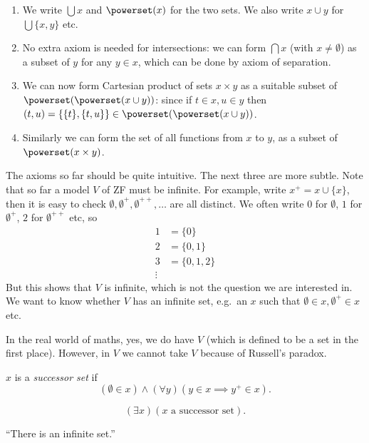 \documentclass[a4paper]{article}
\begin{document}
\begin{note}\leavevmode
  \begin{enumerate}
  \item We write \(\bigcup x\) and \(\powerset(x)\) for the two sets. We also write \(x \cup y\) for \(\bigcup \{x, y\}\) etc.
  \item No extra axiom is needed for intersections: we can form \(\bigcap x\) (with \(x \neq \emptyset\)) as a subset of \(y\) for any \(y \in x\), which can be done by axiom of separation.
  \item We can now form Cartesian product of sets \(x \times y\) as a suitable subset of \(\powerset(\powerset(x \cup y))\): since if \(t \in x, u \in y\) then \((t, u) = \{\{t\}, \{t, u\}\} \in \powerset(\powerset(x \cup y))\).
  \item Similarly we can form the set of all functions from \(x\) to \(y\), as a subset of \(\powerset(x \times y)\).
  \end{enumerate}
\end{note}

The axioms so far should be quite intuitive. The next three are more subtle. Note that so far a model \(V\) of ZF must be infinite. For example, write \(x^+ = x \cup \{x\}\), then it is easy to check \(\emptyset, \emptyset^+, \emptyset^{++}, \dots\) are all distinct. We often write \(0\) for \(\emptyset\), \(1\) for \(\emptyset^+\), \(2\) for \(\emptyset^{++}\) etc, so
\begin{align*}
  1 &= \{0\} \\
  2 &= \{0, 1\} \\
  3 &= \{0, 1, 2\} \\
  \vdots
\end{align*}
But this shows that \(V\) is infinite, which is not the question we are interested in. We want to know whether \(V \) has an infinite set, e.g.\ an \(x\) such that \(\emptyset \in x, \emptyset^+ \in x\) etc.

In the real world of maths, yes, we do have \(V\) (which is defined to be a set in the first place). However, in \(V\) we cannot take \(V\) because of Russell's paradox.

\begin{definition}
  \(x\) is a \emph{successor set} if
  \[
    (\emptyset \in x) \land (\forall y) (y \in x \implies y^+ \in x).
  \]
\end{definition}

\begin{axiom*}
  \[
    (\exists x) (x \text{ a successor set}).
  \]
\end{axiom*}
``There is an infinite set.''
\end{document}
